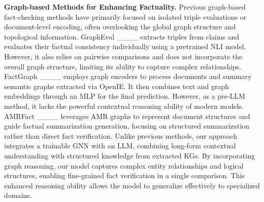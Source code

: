 \noindent\textbf{Graph-based Methods for Enhancing Factuality. }
Previous graph-based fact-checking methods have primarily focused on isolated triple evaluations or document-level encoding, often overlooking the global graph structure and topological information. 
GraphEval ____ extracts triples from claims and evaluates their factual consistency individually using a pretrained NLI model. 
However, it also relies on pairwise comparisons and does not incorporate the overall graph structure, limiting its ability to capture complex relationships. 
FactGraph ____ employs graph encoders to process documents and summary semantic graphs extracted via OpenIE. It then combines text and graph embeddings through an MLP for the final prediction. 
However, as a pre-LLM method, it lacks the powerful contextual reasoning ability of modern models. 
AMRFact ____ leverages AMR graphs to represent document structures and guide factual summarization generation, focusing on structured summarization rather than direct fact verification.
Unlike previous methods, our approach integrates a trainable GNN with an LLM, combining long-form contextual understanding with structured knowledge from extracted KGs. By incorporating graph reasoning, our model captures complex entity relationships and logical structures, enabling fine-grained fact verification in a single comparison. 
This enhanced reasoning ability allows the model to generalize effectively to specialized domains.


